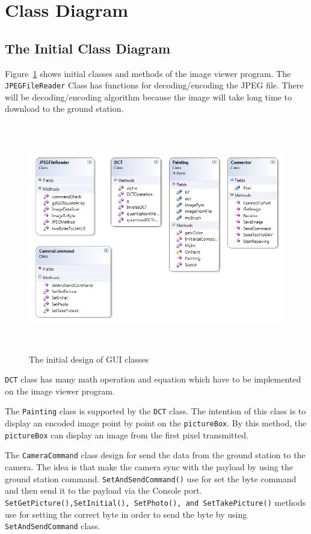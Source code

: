 \section{Class Diagram}
\subsection*{The Initial Class Diagram}
Figure~\ref{ini_Class} shows initial classes and methods of the image viewer program.
The \texttt{JPEGFileReader} Class has functions for decoding/encoding the JPEG file.
There will be decoding/encoding algorithm because the image will take long time to download to the ground station. 
\begin{center}
\begin{figure}[!hbtp]
\includegraphics[width=150mm,height=100mm]{figures/initialClassDiagram.png} 
\caption{The initial design of GUI classes\label{ini_Class}}
\end{figure}
\end{center}
\texttt{DCT} class has many math operation and equation which have to be implemented on the image viewer program. 

The \texttt{Painting} class is supported by the \texttt{DCT} class. The intention of this class is to display an encoded image point by point on the \texttt{pictureBox}.
By this method, the \texttt{pictureBox} can display an image from the first pixel transmitted.

The \texttt{CameraCommand} class design for send the data from the ground station to the camera. The idea is that make the camera sync with the payload by using the ground station command. \texttt{SetAndSendCommand()} use for set the byte command and then send it to the payload via the Console port. \texttt{SetGetPicture(),SetInitial(), SetPhoto(), and SetTakePicture()} methods use for setting the correct byte in order to send the byte by using \texttt{SetAndSendCommand} class.

